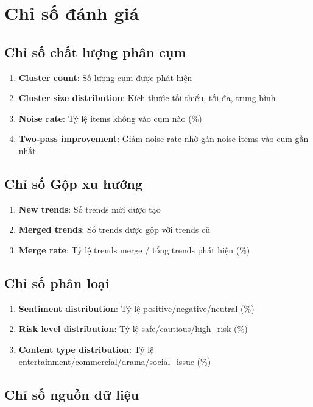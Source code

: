 \section{Chỉ số đánh giá}

\subsection{Chỉ số chất lượng phân cụm}

\begin{enumerate}
    \item \textbf{Cluster count}: Số lượng cụm được phát hiện
    \item \textbf{Cluster size distribution}: Kích thước tối thiểu, tối đa, trung bình
    \item \textbf{Noise rate}: Tỷ lệ items không vào cụm nào (\%)
    \item \textbf{Two-pass improvement}: Giảm noise rate nhờ gán noise items vào cụm gần nhất
\end{enumerate}

\subsection{Chỉ số Gộp xu hướng}

\begin{enumerate}
    \item \textbf{New trends}: Số trends mới được tạo
    \item \textbf{Merged trends}: Số trends được gộp với trends cũ
    \item \textbf{Merge rate}: Tỷ lệ trends merge / tổng trends phát hiện (\%)
\end{enumerate}

\subsection{Chỉ số phân loại}

\begin{enumerate}
    \item \textbf{Sentiment distribution}: Tỷ lệ positive/negative/neutral (\%)
    \item \textbf{Risk level distribution}: Tỷ lệ safe/cautious/high\_risk (\%)
    \item \textbf{Content type distribution}: Tỷ lệ entertainment/commercial/drama/social\_issue (\%)
\end{enumerate}

\subsection{Chỉ số nguồn dữ liệu}

